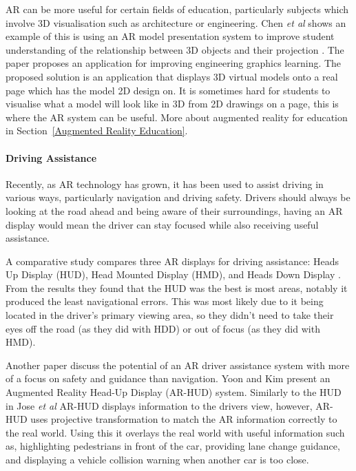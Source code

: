 \documentclass[journal]{IEEEtran}
\begin{document}
AR can be more useful for certain fields of education, particularly subjects which involve 3D visualisation such as architecture or engineering.  Chen \textit{et al} shows an example of this is using an AR model presentation system to improve student understanding of the relationship between 3D objects and their projection \cite{chen_application_2011}. The paper proposes an application for improving engineering graphics learning. The proposed solution is an application that displays 3D virtual models onto a real page which has the model 2D design on. It is sometimes hard for students to visualise what a model will look like in 3D from 2D drawings on a page, this is where the AR system can be useful. More about augmented reality for education in Section~\ref{Augmented Reality Education}.  

\paragraph{Driving Assistance}
Recently, as AR technology has grown, it has been used to assist driving in various ways, particularly navigation and driving safety. Drivers should always be looking at the road ahead and being aware of their surroundings, having an AR display would mean the driver can stay focused while also receiving useful assistance.

A comparative study compares three AR displays for driving assistance: Heads Up Display (HUD), Head Mounted Display (HMD), and Heads Down Display \cite{jose_comparative_2016}. From the results they found that the HUD was the best is most areas, notably it produced the least navigational errors. This was most likely due to it being located in the driver's primary viewing area, so they didn't need to take their eyes off the road (as they did with HDD) or out of focus (as they did with HMD).

Another paper discuss the potential of an AR driver assistance system with more of a focus on safety and guidance than navigation. Yoon and Kim \cite{yoon_augmented_2015} present an Augmented Reality Head-Up Display (AR-HUD) system. Similarly to the HUD in Jose \textit{et al} \cite{jose_comparative_2016} AR-HUD displays information to the drivers view, however, AR-HUD uses projective transformation to match the AR information correctly to the real world. Using this it overlays the real world with useful information such as, highlighting pedestrians in front of the car, providing lane change guidance, and displaying a vehicle collision warning when another car is too close.    
\end{document}
